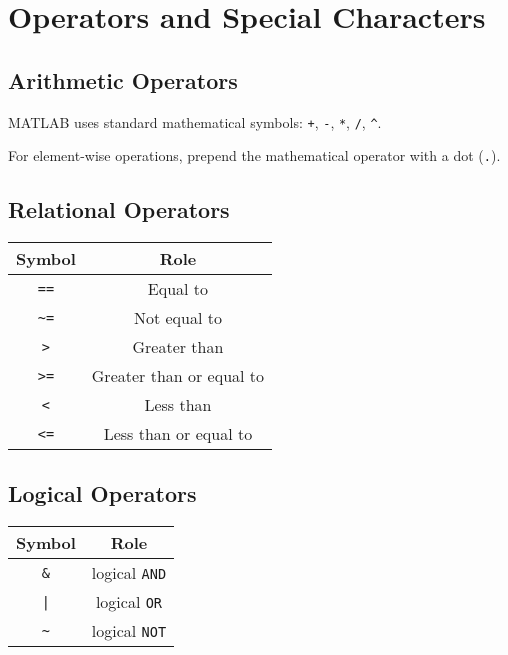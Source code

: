 \documentclass{article}
\begin{document}
\section*{Operators and Special Characters}
\subsection*{Arithmetic Operators}
MATLAB uses standard mathematical symbols: \lstinline!+!, \lstinline!-!, \lstinline!*!, \lstinline!/!, \lstinline!^!.

\noindent For element-wise operations, prepend the mathematical operator with a dot (\lstinline!.!).
\begin{multicols}{2}
    \subsection*{Relational Operators}
    \begin{table}[H]
        \centering
        \begin{tabular}{c | c}
            \toprule
            \textbf{Symbol} & \textbf{Role} \\
            \midrule
            \lstinline!==! & Equal to \\
            \lstinline!~=! & Not equal to \\
            \lstinline!>!  & Greater than \\
            \lstinline!>=! & Greater than or equal to \\
            \lstinline!<!  & Less than \\
            \lstinline!<=! & Less than or equal to \\
            \bottomrule
        \end{tabular}
    \end{table}
    \columnbreak
    \subsection*{Logical Operators}
    \begin{table}[H]
        \centering
        \begin{tabular}{c | c}
            \toprule
            \textbf{Symbol} & \textbf{Role} \\
            \midrule
            \lstinline!&! & logical \lstinline!AND! \\
            \lstinline!|! & logical \lstinline!OR! \\
            \lstinline!~! & logical \lstinline!NOT! \\
            \bottomrule
        \end{tabular}
    \end{table}
\end{multicols}
\end{document}
